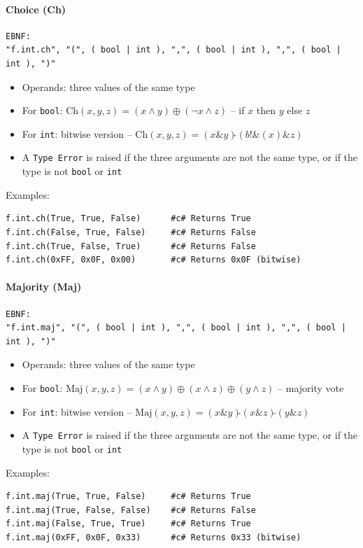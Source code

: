 \paragraph{Choice (Ch)}
\begin{verbatim}
EBNF:
"f.int.ch", "(", ( bool | int ), ",", ( bool | int ), ",", ( bool | int ), ")"
\end{verbatim}
\begin{itemize}
\item Operands: three values of the same type
\item For \texttt{bool}: $\text{Ch}(x, y, z) = (x \land y) \oplus (\lnot x \land z)$ -- if $x$ then $y$ else $z$
\item For \texttt{int}: bitwise version -- $\text{Ch}(x, y, z) = (x \mathbin{\&} y) \mathbin{\hat{}\hat{}} (\mathbin{b!\&}(x) \mathbin{\&} z)$
\item A \texttt{Type Error} is raised if the three arguments are not the same type, or if the type is not \texttt{bool} or \texttt{int}
\end{itemize}
Examples:
\begin{verbatim}
f.int.ch(True, True, False)      #c# Returns True
f.int.ch(False, True, False)     #c# Returns False
f.int.ch(True, False, True)      #c# Returns False
f.int.ch(0xFF, 0x0F, 0x00)       #c# Returns 0x0F (bitwise)
\end{verbatim}

\paragraph{Majority (Maj)}
\begin{verbatim}
EBNF:
"f.int.maj", "(", ( bool | int ), ",", ( bool | int ), ",", ( bool | int ), ")"
\end{verbatim}
\begin{itemize}
\item Operands: three values of the same type
\item For \texttt{bool}: $\text{Maj}(x, y, z) = (x \land y) \oplus (x \land z) \oplus (y \land z)$ -- majority vote
\item For \texttt{int}: bitwise version -- $\text{Maj}(x, y, z) = (x \mathbin{\&} y) \mathbin{\hat{}\hat{}} (x \mathbin{\&} z) \mathbin{\hat{}\hat{}} (y \mathbin{\&} z)$
\item A \texttt{Type Error} is raised if the three arguments are not the same type, or if the type is not \texttt{bool} or \texttt{int}
\end{itemize}
Examples:
\begin{verbatim}
f.int.maj(True, True, False)     #c# Returns True
f.int.maj(True, False, False)    #c# Returns False
f.int.maj(False, True, True)     #c# Returns True
f.int.maj(0xFF, 0x0F, 0x33)      #c# Returns 0x33 (bitwise)
\end{verbatim}


